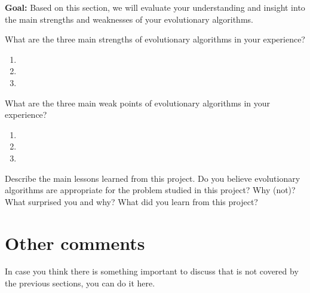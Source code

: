 \documentclass[a4paper,10pt]{article}
\newcommand{\ReplaceMe}[1]{{\color{blue}#1}}
\newcommand{\RemoveMe}[1]{{\color{purple}#1}}
\begin{document}
\RemoveMe{\textbf{Goal:} Based on this section, we will evaluate your understanding and insight into the main strengths and weaknesses of your evolutionary algorithms.}

\ReplaceMe{What are the three main strengths of evolutionary algorithms in your experience?}

\begin{enumerate}
 \item 
 \item 
 \item 
\end{enumerate}

\ReplaceMe{What are the three main weak points of evolutionary algorithms in your experience?}

\begin{enumerate}
 \item 
 \item 
 \item 
\end{enumerate}

\ReplaceMe{Describe the main lessons learned from this project. Do you believe evolutionary algorithms are appropriate for the problem studied in this project? Why (not)? What surprised you and why? What did you learn from this project?}

\section{Other comments} \label{sec_other}

\ReplaceMe{In case you think there is something important to discuss that is not covered by the previous sections, you can do it here. }



\end{document}
